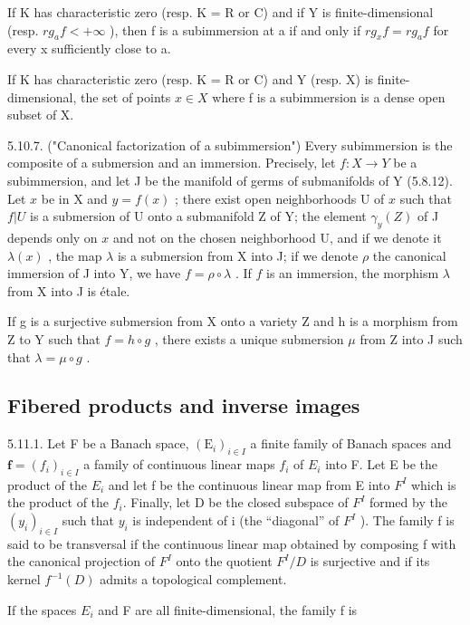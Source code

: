 If K has characteristic zero (resp. K = R or C) and if Y is finite-dimensional (resp. \(rg_{a}f < +\infty\) ), then f is a subimmersion at a if and only if \(rg_{x}f = rg_{a}f\) for every x sufficiently close to a.

If K has characteristic zero (resp. K = R or C) and Y (resp. X) is finite-dimensional, the set of points \(x \in X\) where f is a subimmersion is a dense open subset of X.

5.10.7. ("Canonical factorization of a subimmersion") Every subimmersion is the composite of a submersion and an immersion. Precisely, let \(f: X \to Y\) be a subimmersion, and let J be the manifold of germs of submanifolds of Y (5.8.12). Let \(x\) be in X and \(y = f(x)\) ; there exist open neighborhoods U of \(x\) such that \(f|U\) is a submersion of U onto a submanifold Z of Y; the element \(\gamma_y(Z)\) of J depends only on \(x\) and not on the chosen neighborhood U, and if we denote it \(\lambda(x)\) , the map \(\lambda\) is a submersion from X into J; if we denote \(\rho\) the canonical immersion of J into Y, we have \(f = \rho \circ \lambda\) . If \(f\) is an immersion, the morphism \(\lambda\) from X into J is étale.

If g is a surjective submersion from X onto a variety Z and h is a morphism from Z to Y such that \(f = h \circ g\) , there exists a unique submersion \(\mu\) from Z into J such that \(\lambda = \mu \circ g\) .

\subsection{Fibered products and inverse images}

5.11.1. Let F be a Banach space, \((\mathrm{E}_{i})_{i\in I}\) a finite family of Banach spaces and \(\mathbf{f}=(f_{i})_{i\in I}\) a family of continuous linear maps \(f_{i}\) of \(E_{i}\) into F. Let E be the product of the \(E_{i}\) and let f be the continuous linear map from E into \(F^{I}\) which is the product of the \(f_{i}\). Finally, let D be the closed subspace of \(F^{I}\) formed by the \((y_{i})_{i\in I}\) such that \(y_{i}\) is independent of i (the “diagonal” of \(F^{I}\) ). The family f is said to be transversal if the continuous linear map obtained by composing f with the canonical projection of \(F^{I}\) onto the quotient \(F^{I}/D\) is surjective and if its kernel \(f^{-1}(D)\) admits a topological complement.

If the spaces \(E_{i}\) and F are all finite-dimensional, the family f is

